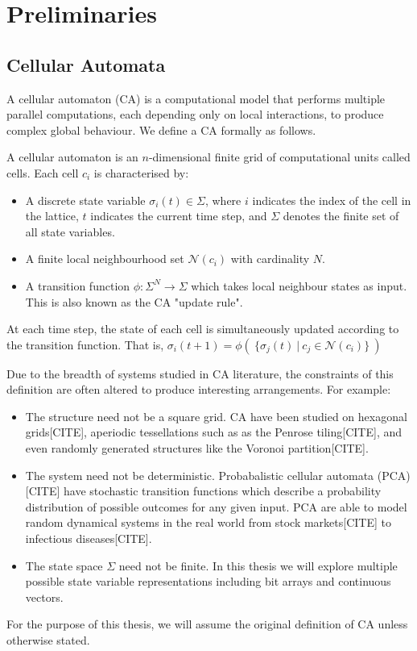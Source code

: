 \chapter{Preliminaries}

\section{Cellular Automata}

A cellular automaton (CA) is a computational model that performs multiple parallel computations, each depending only on local interactions, to produce complex global behaviour. We define a CA formally as follows.

\begin{definition}
A cellular automaton is an $n$-dimensional finite grid of computational units called cells. Each cell $c_i$ is characterised by:
\begin{itemize}
  \item A discrete state variable $\sigma_i(t) \in \Sigma$, where $i$ indicates the index of the cell in the lattice, $t$ indicates the current time step, and $\Sigma$ denotes the finite set of all state variables.
  \item A finite local neighbourhood set $\mathcal{N}(c_i)$ with cardinality $N$.
  \item A transition function $\phi:\Sigma^N \to \Sigma$ which takes local neighbour states as input. This is also known as the CA "update rule".
\end{itemize}

At each time step, the state of each cell is simultaneously updated according to the transition function. That is, $\sigma_i(t+1) = \phi( \:\{ \sigma_j(t) \: | \: c_j \in \mathcal{N}(c_i) \} \:)$
\end{definition}

Due to the breadth of systems studied in CA literature, the constraints of this definition are often altered to produce interesting arrangements. For example:
\begin{itemize}
  \item The structure need not be a square grid. CA have been studied on hexagonal grids[CITE], aperiodic tessellations such as as the Penrose tiling[CITE], and even randomly generated structures like the Voronoi partition[CITE].
  \item The system need not be deterministic. Probabalistic cellular automata (PCA)[CITE] have stochastic transition functions which describe a probability distribution of possible outcomes for any given input. PCA are able to model random dynamical systems in the real world from stock markets[CITE] to infectious diseases[CITE].
  \item The state space $\Sigma$ need not be finite. In this thesis we will explore multiple possible state variable representations including bit arrays and continuous vectors.
\end{itemize}
For the purpose of this thesis, we will assume the original definition of CA unless otherwise stated. 

